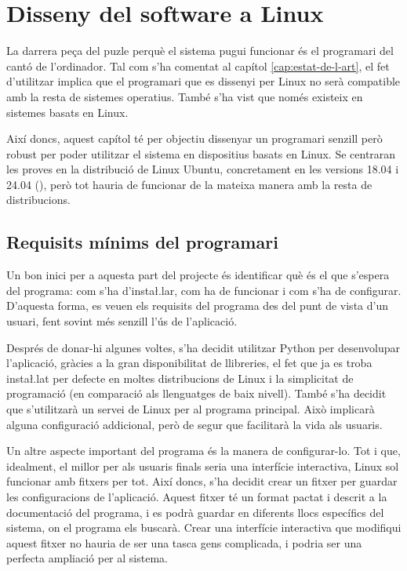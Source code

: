 \chapter{Disseny del software a Linux}

La darrera peça del puzle perquè el sistema pugui funcionar és el
programari del cantó de l'ordinador. Tal com s'ha comentat al capítol
\ref{cap:estat-de-l-art}, el fet d'utilitzar  implica que el
programari que es dissenyi per Linux no serà compatible amb la resta de
sistemes operatius. També s'ha vist que  només existeix en sistemes
basats en Linux.

Així doncs, aquest capítol té per objectiu dissenyar un programari senzill però
robust per poder utilitzar el sistema en dispositius basats en Linux. Se
centraran les proves en la distribució de Linux Ubuntu, concretament en
les versions 18.04 i 24.04  (), però tot hauria
de funcionar de la mateixa manera amb la resta de distribucions.

\section{Requisits mínims del programari}

Un bon inici per a aquesta part del projecte és identificar què és el que
s'espera del programa: com s'ha d'insta\l.lar, com ha de funcionar i com
s'ha de configurar. D'aquesta forma, es veuen els requisits del programa des del
punt de vista d'un usuari, fent sovint més senzill l'ús de l'aplicació.

Després de donar-hi algunes voltes, s'ha decidit utilitzar Python per
desenvolupar l'aplicació, gràcies a la gran disponibilitat de llibreries, el fet
que ja es troba insta\l.lat per defecte en moltes distribucions de Linux i
la simplicitat de programació (en comparació als llenguatges de baix nivell).
També s'ha decidit que s'utilitzarà un servei de Linux per al programa principal.
Això implicarà alguna configuració addicional, però de segur que facilitarà
la vida als usuaris.

Un altre aspecte important del programa és la manera de configurar-lo. Tot i que,
idealment, el millor per als usuaris finals seria una interfície interactiva,
Linux sol funcionar amb fitxers per tot. Així doncs, s'ha decidit crear un fitxer
 per guardar les configuracions de l'aplicació. Aquest fitxer té
un format pactat i descrit a la documentació del programa, i es podrà guardar en
diferents llocs específics del sistema, on el programa els buscarà. Crear una
interfície interactiva que modifiqui aquest fitxer no hauria de ser una tasca
gens complicada, i podria ser una perfecta ampliació per al sistema.

